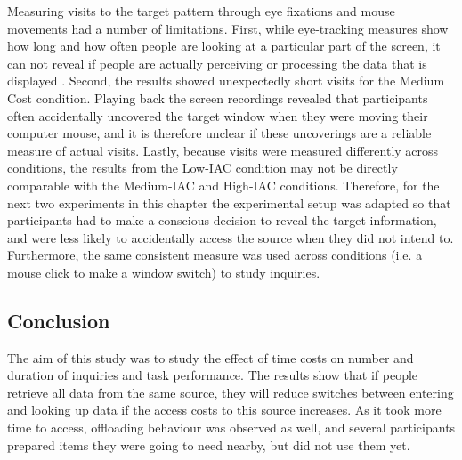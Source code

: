 Measuring visits to the target pattern through eye fixations and mouse movements had a number of limitations.  
First, while eye-tracking measures show how long and how often people are looking at a particular part of the screen, it can not reveal if people are actually perceiving or processing the data that is displayed \citep{Waldron2007}. Second, the results showed unexpectedly short visits for the Medium Cost condition. Playing back the screen recordings revealed that participants often accidentally uncovered the target window when they were moving their computer mouse, and it is therefore unclear if these uncoverings are a reliable measure of actual visits. Lastly, because visits were measured differently across conditions, the results from the Low-IAC condition may not be directly comparable with the Medium-IAC and High-IAC conditions. Therefore, for the next two experiments in this chapter the experimental setup was adapted so that participants had to make a conscious decision to reveal the target information, and were less likely to accidentally access the source when they did not intend to. Furthermore, the same consistent measure was used across conditions (i.e. a mouse click to make a window switch) to study inquiries. 

 
 
 \subsection{Conclusion}
The aim of this study was to study the effect of time costs on number and duration of inquiries and task performance. The results show that if people retrieve all data from the same source, they will reduce switches between entering and looking up data if the access costs to this source increases. As it took more time to access, offloading behaviour was observed as well, and several participants prepared items they were going to need nearby, but did not use them yet. 

